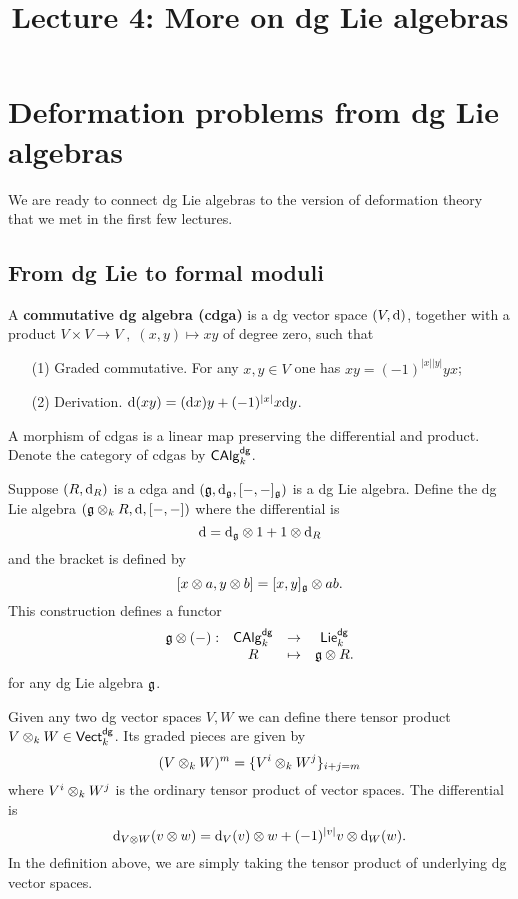 \documentclass[11pt]{amsart}
\title{Lecture 4: More on dg Lie algebras}
\def\dgVect{{\sf Vect}^{\sf dg}}
\begin{document}
\section{Deformation problems from dg Lie algebras}

We are ready to connect dg Lie algebras to the version of deformation theory that we met in the first few lectures. 

\subsection{From dg Lie to formal moduli}

\begin{dfn}
A {\bf commutative dg algebra (cdga)} is a dg vector space $(V,{\rm d})$, together with a product $V \times V \to V \;,\; (x,y) \mapsto xy$ of degree zero, such that 
\begin{enumerate}
\item[(1)] Graded commutative. 
For any $x,y \in V$ one has $xy = (-1)^{|x||y|} y x$;
\item[(2)] Derivation. ${\rm d} (xy) = ({\rm d} x) y + (-1)^{|x|} x {\rm d} y$.
\end{enumerate}
A morphism of cdgas is a linear map preserving the differential and product. 
Denote the category of cdgas by ${\sf CAlg}_{k}^{\sf dg}$.
\end{dfn}

\begin{dfn} Suppose $(R,{\rm d}_R)$ is a cdga and $(\mathfrak g,{\rm d}_{\mathfrak g}, [-,-]_\mathfrak g)$ is a dg Lie algebra. 
Define the dg Lie algebra $(\mathfrak g \otimes_k R, {\rm d}, [-,-])$ where the differential is 
\[
{\rm d} = {\rm d}_\mathfrak g \otimes 1 + 1 \otimes {\rm d}_{R}
\]
and the bracket is defined by
\[
[x \otimes a, y \otimes b] = [x,y]_\mathfrak g \otimes ab .
\] 
This construction defines a functor
\[
\begin{array}{cccc}
\mathfrak g \otimes (-) : & {\sf CAlg}_{k}^{\sf dg} & \to & {\sf Lie}_k^{\sf dg} \\
& R & \mapsto & \mathfrak g \otimes R .
\end{array}
\]
for any dg Lie algebra $\mathfrak g$. 
\end{dfn}

\begin{rmk}
Given any two dg vector spaces $V, W$ we can define there tensor product $V \tensor_k W \in \dgVect_k$. 
Its graded pieces are given by
\[
(V \otimes_k W)^m = \{V^i \otimes_k W^j\}_{i+j = m}
\]
where $V^i \otimes_k W^j$ is the ordinary tensor product of vector spaces.
The differential is
\[
{\rm d}_{V \otimes W} (v \otimes w) = {\rm d}_V(v) \otimes w + (-1)^{|v|} v \otimes {\rm d}_W (w) .
\]
In the definition above, we are simply taking the tensor product of underlying dg vector spaces. 
\end{rmk}
\end{document}
